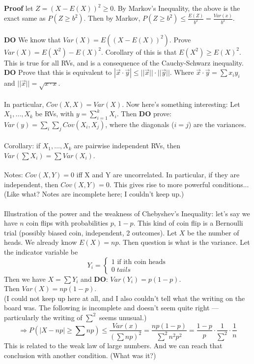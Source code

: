 \documentclass[12pt]{article}
\theoremstyle{remark}
\newcommand*\w[1]{\overrightarrow{#1}}
\begin{document}
\begin{section}
\\\\\textbf{Proof} let $Z=(X-E(X))^2 \geq 0$. By Markov's Inequality, the above is the exact same as $P(Z\geq b^2)$. Then by Markov, $P(Z \geq b^2) \leq \frac{E(Z)}{b^2} = \frac{Var(x)}{b^2}$.
\\\\\textbf{DO} We know that $Var(X) = E((X-E(X))^2)$. Prove $Var(X) = E(X^2) - E(X)^2$. Corollary of this is that $E(X^2) \geq E(X)^2$. This is true for all RVs, and is a consequence of the Cauchy-Schwarz inequality. \textbf{DO} Prove that this is equivalent to $|\w{x}\cdot\w{y} | \leq ||\w{x}||\cdot||\w{y}||$. Where $\w{x} \cdot \w{y} = \sum x_iy_i$ and $||\w{x}|| = \sqrt{x\cdot x}$.
\\\\In particular, $Cov(X,X) = Var(X)$. Now here's something interesting: Let $X_1,\ldots,X_k$ be RVs, with $y = \sum_{i=1}^{k} X_i$. Then \textbf{DO} prove: $Var(y) = \sum_i \sum_j Cov(X_i,X_j)$, where the diagonals ($i=j$) are the variances. 
\\\\Corollary: if $X_1,\ldots,X_k$ are pairwise independent RVs, then $Var(\sum X_i) = \sum Var(X_i)$. 
\\\\Notes: $Cov(X,Y) = 0$ iff X and Y are uncorrelated. In particular, if they are independent, then $Cov(X,Y) =0$. This gives rise to more powerful conditions... (Like what? Notes are incomplete here; I couldn't keep up.)
\\\\
Illustration of the power and the weakness of Chebyshev's Inequality: let's say we have $n$ coin flips with probabilities $p$, $1-p$. This kind of coin flip is a Bernoulli trial (possibly biased coin, independent, 2 outcomes). Let $X$ be the number of heads. We already know $E(X) = np$. Then question is what is the variance. Let the indicator variable be $$Y_i = \begin{cases} 1 \text{ if ith coin heads}\\
0\; tails\end{cases}$$ Then we have $X = \sum Y_i$ and \textbf{DO}: $Var(Y_i) = p(1-p)$.
\\Then $Var(X) = np(1-p)$. 
\\(I could not keep up here at all, and I also couldn't tell what the writing on the board was. The following is incomplete and doesn't seem quite right --- particularly the writing of $\sum^2$ seems unusual.) $$\Rightarrow P(|X-np| \geq \sum np) \leq \frac{Var(x)}{(\sum np)^2} = \frac{np(1-p)}{\sum^2 n^2 p^2} = \frac{1-p}{p} \cdot \frac{1}{\sum^2} \cdot \frac 1n$$
This is related to the weak law of large numbers. And we can reach that conclusion with another condition. (What was it?)
\end{section}
\end{document}
